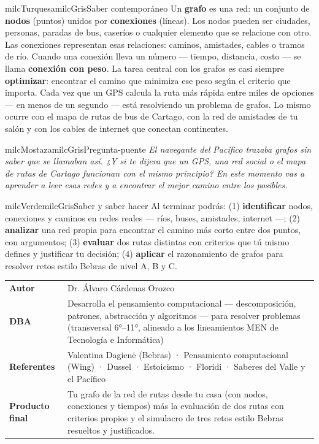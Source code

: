 \documentclass[11pt,letterpaper]{article}
\begin{document}
\begin{softbox}{milcTurquesa}{milcGris}{Saber contemporáneo}
Un \textbf{grafo} es una red: un conjunto de \textbf{nodos} (puntos) unidos por \textbf{conexiones} (líneas). Los nodos pueden ser ciudades, personas, paradas de bus, caseríos o cualquier elemento que se relacione con otro. Las conexiones representan esas relaciones: caminos, amistades, cables o tramos de río. Cuando una conexión lleva un número --- tiempo, distancia, costo --- se llama \textbf{conexión con peso}. La tarea central con los grafos es casi siempre \textbf{optimizar}: encontrar el camino que minimiza ese peso según el criterio que importa. Cada vez que un GPS calcula la ruta más rápida entre miles de opciones --- en menos de un segundo --- está resolviendo un problema de grafos. Lo mismo ocurre con el mapa de rutas de bus de Cartago, con la red de amistades de tu salón y con los cables de internet que conectan continentes.
\end{softbox}

\begin{softbox}{milcMostaza}{milcGris}{Pregunta-puente}
\textit{El navegante del Pacífico trazaba grafos sin saber que se llamaban así. ¿Y si te dijera que un GPS, una red social o el mapa de rutas de Cartago funcionan con el mismo principio? En este momento vas a aprender a leer esas redes y a encontrar el mejor camino entre los posibles.}
\end{softbox}

\begin{softbox}{milcVerde}{milcGris}{Saber y saber hacer}
Al terminar podrás: (1) \textbf{identificar} nodos, conexiones y caminos en redes reales --- ríos, buses, amistades, internet ---; (2) \textbf{analizar} una red propia para encontrar el camino más corto entre dos puntos, con argumentos; (3) \textbf{evaluar} dos rutas distintas con criterios que tú mismo defines y justificar tu decisión; (4) \textbf{aplicar} el razonamiento de grafos para resolver retos estilo Bebras de nivel A, B y C.
\end{softbox}



\small
\begin{tabularx}{\textwidth}{>{\bfseries}p{3.0cm}Y}
Autor & Dr. Álvaro Cárdenas Orozco\\
DBA & Desarrolla el pensamiento computacional --- descomposición, patrones, abstracción y algoritmos --- para resolver problemas (transversal 6°--11°, alineado a los lineamientos MEN de Tecnología e Informática)\\
Referentes & Valentina Dagienė (Bebras) · Pensamiento computacional (Wing) · Dussel · Estoicismo · Floridi · Saberes del Valle y el Pacífico\\
Producto final & Tu grafo de la red de rutas desde tu casa (con nodos, conexiones y tiempos) más la evaluación de dos rutas con criterios propios y el simulacro de tres retos estilo Bebras resueltos y justificados.\\
\end{tabularx}
\normalsize
\end{document}
